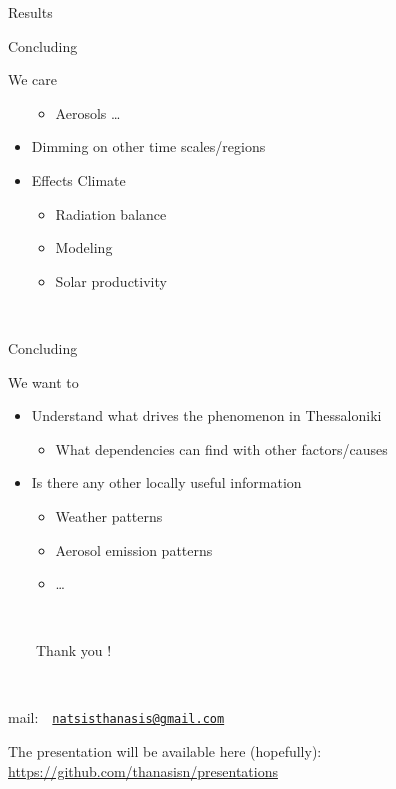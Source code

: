 \documentclass[
  ignorenonframetext,
]{beamer}
\providecommand{\tightlist}{%
  \setlength{\itemsep}{0pt}\setlength{\parskip}{0pt}}\usepackage{longtable,booktabs,array}
\begin{document}
\begin{frame}{Results}
\begin{block}{Concluding}
\begin{block}{We care}
\begin{itemize}
  \begin{itemize}
  \tightlist
  \item
    Aerosols \ldots{}
  \end{itemize}
\item
  Dimming on other time scales/regions
\item
  Effects Climate

  \begin{itemize}
  \tightlist
  \item
    Radiation balance
  \item
    Modeling
  \item
    Solar productivity
  \end{itemize}
\end{itemize}

~

\end{block}
\end{block}

\begin{block}{Concluding}
\protect\hypertarget{concluding-2}{}
\begin{block}{We want to}
\protect\hypertarget{we-want-to}{}
\begin{itemize}
\tightlist
\item
  Understand what drives the phenomenon in Thessaloniki

  \begin{itemize}
  \tightlist
  \item
    What dependencies can find with other factors/causes
  \end{itemize}
\item
  Is there any other locally useful information

  \begin{itemize}
  \tightlist
  \item
    Weather patterns
  \item
    Aerosol emission patterns
  \item
    \ldots{}
  \end{itemize}
\end{itemize}

~

\end{block}
\end{block}
\end{frame}

\begin{frame}
~~~~Thank you ! ~~~~

~ ~

mail:~~\href{mailto:natsisthanasis@gmail.com}{\nolinkurl{natsisthanasis@gmail.com}}

The presentation will be available here (hopefully):
\url{https://github.com/thanasisn/presentations}
\end{frame}
\end{document}
